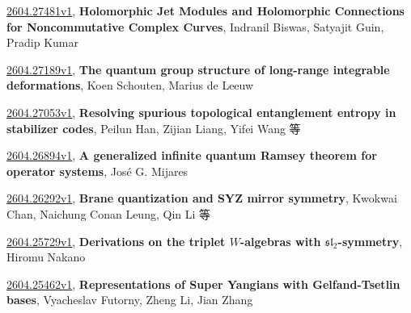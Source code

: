 \documentclass[9pt, a4paper]{article}
\theoremstyle{plain}
\theoremstyle{definition}
\theoremstyle{remark}
\newcommand{\arxiv}[3]{\href{https://arxiv.org/abs/#1}{#1}, \textbf{\textcolor{arxivblue}{#2}}, #3}
\begin{document}
\arxiv{2604.27481v1}{Holomorphic Jet Modules and Holomorphic Connections for Noncommutative Complex Curves}{Indranil Biswas, Satyajit Guin, Pradip Kumar}

\arxiv{2604.27189v1}{The quantum group structure of long-range integrable deformations}{Koen Schouten, Marius de Leeuw}

\arxiv{2604.27053v1}{Resolving spurious topological entanglement entropy in stabilizer codes}{Peilun Han, Zijian Liang, Yifei Wang 等}

\arxiv{2604.26894v1}{A generalized infinite quantum Ramsey theorem for operator systems}{José G. Mijares}

\arxiv{2604.26292v1}{Brane quantization and SYZ mirror symmetry}{Kwokwai Chan, Naichung Conan Leung, Qin Li 等}

\arxiv{2604.25729v1}{Derivations on the triplet $W$-algebras with $\mathfrak{sl}_2$-symmetry}{Hiromu Nakano}

\arxiv{2604.25462v1}{Representations of Super Yangians with Gelfand-Tsetlin bases}{Vyacheslav Futorny, Zheng Li, Jian Zhang}

\end{document}
